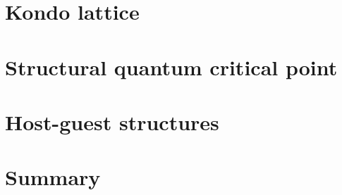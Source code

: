\section{Kondo lattice}


%


% 


\section{Structural quantum critical point}


\section{Host-guest structures}



\section{Summary}
%



\appendix

%
%
%
%


% 

% 









%
%

% 








